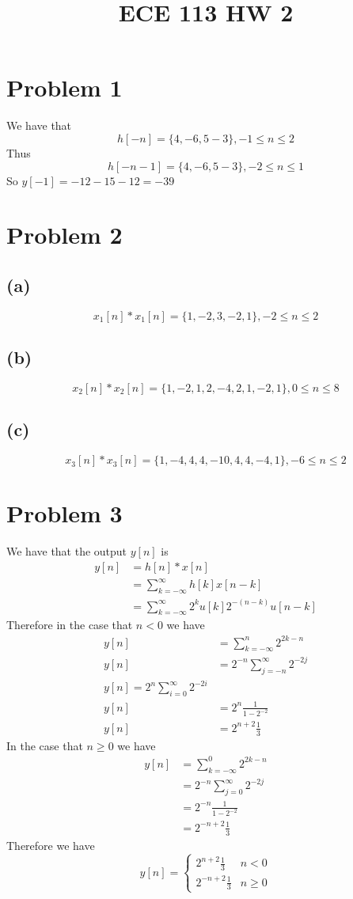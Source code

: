 
\title{ECE 113 HW 2}

\maketitle
\section*{Problem 1}
We have that 
$$h[-n]=\{4,-6,5-3\},-1\leq n \leq 2$$
Thus 
$$h[-n-1]=\{4,-6,5-3\},-2\leq n \leq 1$$
So $y[-1]=-12-15-12=\boxed{-39}$
\section*{Problem 2}
\subsection*{(a)}
$$x_1[n]*x_1[n]=\boxed{\{1,-2,3,-2,1\},-2\leq n \leq 2}$$
\subsection*{(b)}
$$x_2[n]*x_2[n]=\boxed{\{1,-2,1,2,-4,2,1,-2,1\},0\leq n \leq 8}$$
\subsection*{(c)}
$$x_3[n]*x_3[n]=\boxed{\{1, -4, 4, 4, -10, 4, 4, -4, 1\},-6\leq n \leq 2}$$
\section*{Problem 3}
We have that the output $y[n]$ is 
\begin{align*}
y[n]&=h[n]*x[n]\\
&=\sum_{k=-\infty}^{\infty}h[k]x[n-k]\\
&=\sum_{k=-\infty}^{\infty}2^{k}u[k]2^{-(n-k)}u[n-k]
\end{align*}
Therefore in the case that $n<0$ we have
\begin{align*}
y[n]&=\sum_{k=-\infty}^{n}2^{2k-n}\\
y[n]&=2^{-n}\sum_{j=-n}^{\infty}2^{-2j}\\
y[n]=2^{n}\sum_{i=0}^{\infty}2^{-2i}\\
y[n]&=2^{n}\frac{1}{1-2^{-2}}\\
y[n]&=2^{n+2}\frac{1}{3}
\end{align*}
In the case that $n\geq 0$ we have
\begin{align*}
y[n]&=\sum_{k=-\infty}^{0}2^{2k-n}\\
&=2^{-n}\sum_{j=0}^{\infty}2^{-2j}\\
&=2^{-n}\frac{1}{1-2^{-2}}\\
&=2^{-n+2}\frac{1}{3}
\end{align*}
Therefore we have
$$y[n]=\boxed{\begin{cases}
2^{n+2}\frac{1}{3} & n<0\\
2^{-n+2}\frac{1}{3} & n\geq 0
\end{cases}}$$
